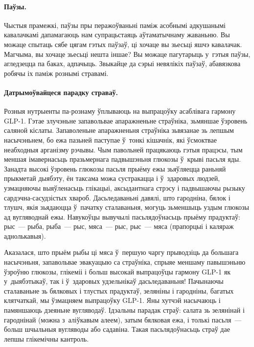 
\paragraph{Паўзы.}
Чыстыя прамежкі, паўзы пры перажоўваньні паміж асобнымі адкушанымі кавалачкамі дапамагаюць нам супрацьстаяць аўтаматычнаму жаваньню. Вы можаце спытаць сябе цягам гэтых паўзаў, ці хочаце вы зьесьці яшчэ кавалачак. Магчыма, вы хочаце зьесьці нешта іншае? Вы можаце пагутарыць у~гэтыя паўзы, агледзецца па баках, адпачыць. Звыкайце да сэрыі невялікіх паўзаў, абавязкова робячы іх паміж рознымі стравамі.

\paragraph{Датрымоўвайцеся парадку страваў.}
Розныя нутрыенты па-рознаму ўплываюць на выпрацоўку асаблівага гармону GLP-1. Гэтае злучэньне запавольвае апаражненьне страўніка, зьмяншае ўзровень саляной кіслаты. Запаволеньне апаражненьня страўніка зьвязанае зь лепшым насычэньнем, бо ежа пазьней паступае ў~тонкі кішачнік, які ўсмоктвае неабходныя арганізму рэчывы. Чым павольней працякаюць гэтыя працэсы, тым меншая імавернасьць празьмернага падвышэньня глюкозы ў~крыві пасьля яды. Занадта высокі ўзровень глюкозы пасьля прыёму ежы зьяўляецца раньняй прыкметай дыябэту, ён таксама можа сустракацца і ў~здаровых людзей, узмацняючы выяўленасьць глікацыі, аксыдантнага стрэсу і падвышаючы рызыку сардэчна-сасудзістых хвароб. Дасьледаваньні давялі, што гародніна, бялок і тлушч, якія зьядаюцца ў~пачатку сталаваньня, могуць зьменшыць уздым глюкозы ад вугляводнай ежы. Навукоўцы вывучылі пасьлядоўнасьць прыёму прадуктаў: рыс~--- рыба, рыба~--- рыс, мяса~--- рыс, рыс~--- мяса (прапорцыі і каляраж аднолькавыя).

Аказалася, што прыём рыбы ці мяса ў~першую чаргу прыводзіць да большага насычэньня, запавольвае эвакуацыю са страўніка, спрыяе меншаму павышэньню ўзроўню глюкозы, глікеміі і больш высокай выпрацоўцы гармону GLP-1 як у~дыябэтыкаў, так і ў~здаровых удзельнікаў дасьледаваньня! Пачынаючы сталаваньне зь бялковых і тлустых прадуктаў, зеляніны і гародніны, багатых клятчаткай, мы ўзмацняем выпрацоўку GLP-1. Яны хутчэй насычаюць і памяншаюць дзеяньне вугляводаў. Ідэальны парадак страў: салата зь зелянінай і гароднінай (можна з~аліўкавым алеем), затым бялковая ежа, і толькі пасьля~--- больш шчыльныя вугляводы або садавіна. Такая пасьлядоўнасьць страў дае лепшы глікемічны кантроль.

